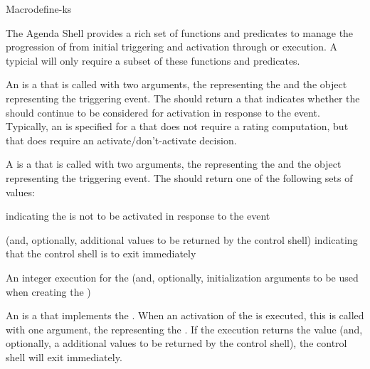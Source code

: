 \documentclass[10pt,twoside,english,pdftex]{article}
\begin{document}
\begin{functiondoc}{Macro}{define-ks}

%
%
%
%
%
%
%
The Agenda Shell provides a rich set of  functions and predicates to
manage the progression of  from initial triggering and activation
through  or execution.  A typicial  will only
require a subset of these functions and predicates.

An  is a  that is called with two
arguments, the  representing the  and the
object representing the triggering event.  The 
should return a  that indicates whether the
 should continue to be considered for activation in response to the
event.  Typically, an  is specified for a
 that does not require a  rating
computation, but that does require an activate/don't-activate decision.

A  is a  that is called with two
arguments, the  representing the  and the
object representing the triggering event.  The 
should return one of the following sets of values:
\begin{tightitemize}
\item \nil{} indicating the  is not to be activated in response to
  the event
\item {} (and, optionally, additional values to be returned by the
  control shell) indicating that the control shell is to exit immediately
\item An integer execution  for the  (and,
  optionally, initialization arguments to be used when creating the
   )
\end{tightitemize}

An  is a  that implements the
.  When an activation of the  is executed, this
 is called with one argument, the 
representing the . If the execution  returns the value
 (and, optionally, a additional values to be returned by the
control shell), the control shell will exit immediately.


\end{functiondoc}
\end{document}

